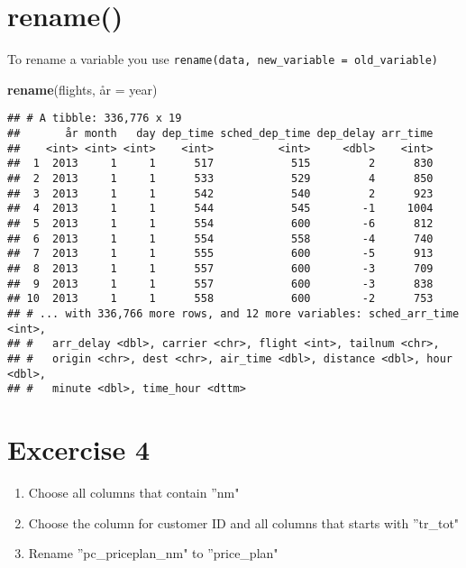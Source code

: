 \documentclass[]{book}
\newenvironment{Shaded}{\begin{snugshade}}{\end{snugshade}}
\newcommand{\DataTypeTok}[1]{\textcolor[rgb]{0.13,0.29,0.53}{#1}}
\newcommand{\KeywordTok}[1]{\textcolor[rgb]{0.13,0.29,0.53}{\textbf{#1}}}
\newcommand{\NormalTok}[1]{#1}
\begin{document}
\hypertarget{rename}{%
\section{rename()}\label{rename}}

To rename a variable you use \texttt{rename(data,\ new\_variable\ =\ old\_variable)}

\begin{Shaded}
\begin{Highlighting}[]
\KeywordTok{rename}\NormalTok{(flights, å}\DataTypeTok{r =}\NormalTok{ year)}
\end{Highlighting}
\end{Shaded}

\begin{verbatim}
## # A tibble: 336,776 x 19
##       år month   day dep_time sched_dep_time dep_delay arr_time
##    <int> <int> <int>    <int>          <int>     <dbl>    <int>
##  1  2013     1     1      517            515         2      830
##  2  2013     1     1      533            529         4      850
##  3  2013     1     1      542            540         2      923
##  4  2013     1     1      544            545        -1     1004
##  5  2013     1     1      554            600        -6      812
##  6  2013     1     1      554            558        -4      740
##  7  2013     1     1      555            600        -5      913
##  8  2013     1     1      557            600        -3      709
##  9  2013     1     1      557            600        -3      838
## 10  2013     1     1      558            600        -2      753
## # ... with 336,766 more rows, and 12 more variables: sched_arr_time <int>,
## #   arr_delay <dbl>, carrier <chr>, flight <int>, tailnum <chr>,
## #   origin <chr>, dest <chr>, air_time <dbl>, distance <dbl>, hour <dbl>,
## #   minute <dbl>, time_hour <dttm>
\end{verbatim}

\hypertarget{excercise-4}{%
\section{Excercise 4}\label{excercise-4}}

\begin{enumerate}
\def\labelenumi{\arabic{enumi}.}
\item
  Choose all columns that contain ''nm"
\item
  Choose the column for customer ID and all columns that starts with ''tr\_tot"
\item
  Rename ''pc\_priceplan\_nm" to ''price\_plan"
\end{enumerate}
\end{document}
